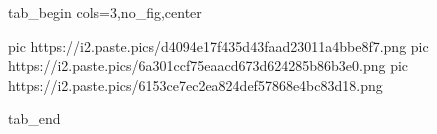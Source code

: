  
 
 
 
 


\ifcmt
  tab_begin cols=3,no_fig,center

     pic https://i2.paste.pics/d4094e17f435d43faad23011a4bbe8f7.png
		 pic https://i2.paste.pics/6a301ccf75eaacd673d624285b86b3e0.png
		 pic https://i2.paste.pics/6153ce7ec2ea824def57868e4bc83d18.png

  tab_end
\fi
